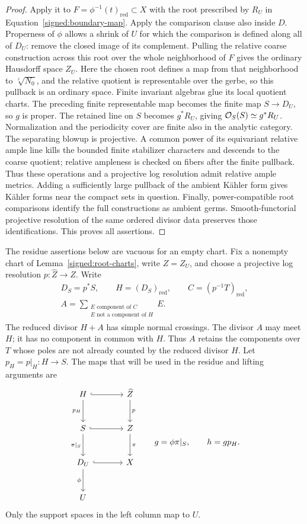 \begin{proof}
Apply it to \(F=\phi^{-1}(t)_{\mathrm{red}}\subset X\) with
the root prescribed by \(R_U\) in
Equation~\eqref{signed:boundary-map}.  Apply the comparison
clause also inside \(D\).  Properness of \(\phi\) allows a
shrink of \(U\) for which the comparison is defined along all
of \(D_U\): remove the closed image of its complement.
Pulling the relative coarse construction across this root
over the whole neighborhood of \(F\) gives the ordinary Hausdorff space
\(Z_U\).  Here the chosen root defines a map from that neighborhood to
\(\sqrt[\ell]{N_0}\), and the relative quotient is representable over
the gerbe, so this pullback is an ordinary space.  Finite invariant algebras
glue its local quotient charts.  The preceding finite representable map
becomes the finite map \(S\to D_U\), so \(g\) is proper.  The retained
line on \(S\) becomes \(g^*R_U\), giving \(\mathcal O_S(S)\simeq g^*R_U\).
Normalization and the periodicity cover are finite also in the analytic
category.  The separating blowup is projective.  A common
power of its equivariant relative ample line kills the bounded
finite stabilizer characters and descends to the coarse
quotient; relative ampleness is checked on fibers after the
finite pullback.  Thus these operations and a projective log
resolution admit relative ample metrics.  Adding a sufficiently
large pullback of the ambient Kähler form gives Kähler forms
near the compact sets in question.  Finally, power-compatible
root comparisons identify the full constructions as ambient
germs.  Smooth-functorial projective resolution of the same
ordered divisor data preserves those identifications.  This
proves all assertions.
\end{proof}

The residue assertions below are vacuous for an empty chart.  Fix a
nonempty chart of Lemma~\ref{signed:root-charts}, write \(Z=Z_U\), and
choose a projective log resolution \(p:\widehat Z\to Z\).  Write
\begin{equation}\label{signed:resolved-divisors}
\begin{gathered}
 D_S=p^*S,\qquad H=(D_S)_{\mathrm{red}},\qquad
 C=(p^{-1}T)_{\mathrm{red}},\\
 A=\sum_{\substack{E\text{ component of }C\\E\text{ not a component of }H}}E.
\end{gathered}
\end{equation}
The reduced divisor \(H+A\) has simple normal crossings.
The divisor \(A\) may meet \(H\); it has no component in
common with \(H\).  Thus \(A\) retains the components over \(T\)
whose poles are not already counted by the reduced divisor \(H\).
Let \(p_H=p|_H:H\to S\).
The maps that will be used in the residue and lifting arguments are
\[
\begin{tikzcd}[column sep=large,row sep=large]
H \arrow[r,hook] \arrow[d,"p_H"'] &
\widehat Z \arrow[d,"p"]\\
S \arrow[r,hook] \arrow[d,"\pi|_S"'] &
Z \arrow[d,"\pi"]\\
D_U \arrow[r,hook] \arrow[d,"\phi"'] & X\\
U &
\end{tikzcd}
\qquad g=\phi\pi|_S,\qquad h=g p_H.
\]
Only the support spaces in the left column map to \(U\).


